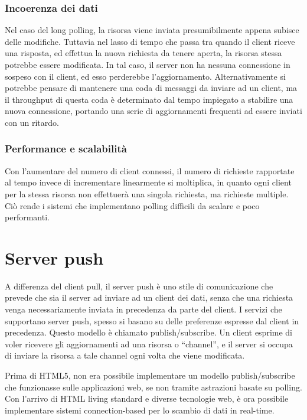 \documentclass[12pt,a4paper,openright,twoside]{report}
\begin{document}
\subsubsection{Incoerenza dei dati}
Nel caso del long polling, la risorsa viene inviata presumibilmente appena subisce delle modifiche. Tuttavia nel lasso di tempo che passa tra quando il client riceve una risposta, ed effettua la nuova richiesta da tenere aperta, la risorsa stessa potrebbe essere modificata. In tal caso, il server non ha nessuna connessione in sospeso con il client, ed esso perderebbe l’aggiornamento. Alternativamente si potrebbe pensare di mantenere una coda di messaggi da inviare ad un client, ma il throughput di questa coda è determinato dal tempo impiegato a stabilire una nuova connessione, portando una serie di aggiornamenti frequenti ad essere inviati con un ritardo.

\subsubsection{Performance e scalabilità}
Con l’aumentare del numero di client connessi, il numero di richieste rapportate al tempo invece di incrementare linearmente si moltiplica, in quanto ogni client per la stessa risorsa non effettuerà una singola richiesta, ma richieste multiple. Ciò rende i sistemi che implementano polling difficili da scalare e poco performanti.

\section{Server push}\label{sec_serverpush}
A differenza del client pull, il server push è uno stile di comunicazione che prevede che sia il server ad inviare ad un client dei dati, senza che una richiesta venga necessariamente inviata in precedenza da parte del client. I servizi che supportano server push, spesso si basano su delle preferenze espresse dal client in precedenza. Questo modello è chiamato publish/subscribe. Un client esprime di voler ricevere gli aggiornamenti ad una risorsa o “channel”, e il server si occupa di inviare la risorsa a tale channel ogni volta che viene modificata.

\bigskip

Prima di HTML5, non era possibile implementare un modello publish/subscribe che funzionasse sulle applicazioni web, se non tramite astrazioni basate su polling. Con l’arrivo di HTML living standard e diverse tecnologie web, è ora possibile implementare sistemi connection-based per lo scambio di dati in real-time.
\end{document}
